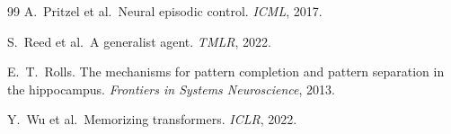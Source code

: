 \documentclass[10pt,letterpaper,fontset=fandol]{ctexart}
\begin{document}
\begin{thebibliography}{99}
A.~Pritzel et al.\ \newblock Neural episodic control. \emph{ICML}, 2017.

S.~Reed et al.\ \newblock A generalist agent. \emph{TMLR}, 2022.

E.~T.~Rolls. \newblock The mechanisms for pattern completion and pattern separation in the hippocampus. \emph{Frontiers in Systems Neuroscience}, 2013.

Y.~Wu et al.\ \newblock Memorizing transformers. \emph{ICLR}, 2022.

\end{thebibliography}
\end{document}

